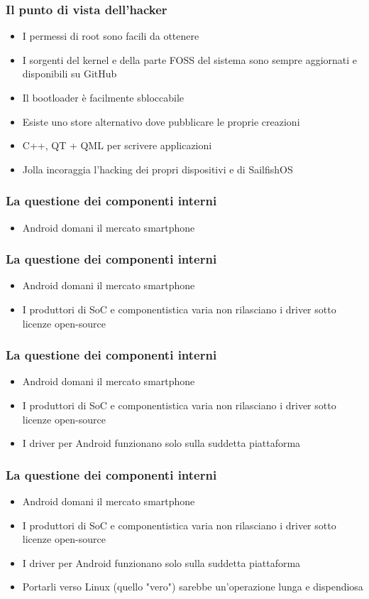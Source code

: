 \documentclass[12pt]{beamer}
\begin{document}
\begin{frame}
	\frametitle{Il punto di vista dell'hacker}
	\begin{itemize}
		\item I permessi di root sono facili da ottenere
		\item I sorgenti del kernel e della parte FOSS del sistema sono sempre aggiornati e disponibili su GitHub
		\item Il bootloader è facilmente sbloccabile
		\item Esiste uno store alternativo dove pubblicare le proprie creazioni
		\item C++, QT + QML per scrivere applicazioni
		\item Jolla incoraggia l'hacking dei propri dispositivi e di SailfishOS
	\end{itemize}
\end{frame}


\begin{frame}
\frametitle{La questione dei componenti interni}
\begin{itemize}
\item Android domani il mercato smartphone
\end{itemize}
\end{frame}

\begin{frame}
\frametitle{La questione dei componenti interni}
\begin{itemize}
\item Android domani il mercato smartphone
\item I produttori di SoC e componentistica varia non rilasciano i driver sotto licenze open-source
\end{itemize}
\end{frame}

\begin{frame}
\frametitle{La questione dei componenti interni}
\begin{itemize}
\item Android domani il mercato smartphone
\item I produttori di SoC e componentistica varia non rilasciano i driver sotto licenze open-source
\item I driver per Android funzionano solo sulla suddetta piattaforma
\end{itemize}
\end{frame}

\begin{frame}
\frametitle{La questione dei componenti interni}
\begin{itemize}
\item Android domani il mercato smartphone
\item I produttori di SoC e componentistica varia non rilasciano i driver sotto licenze open-source
\item I driver per Android funzionano solo sulla suddetta piattaforma
\item Portarli verso Linux (quello "vero") sarebbe un'operazione lunga e dispendiosa
\end{itemize}
\end{frame}
\end{document}
